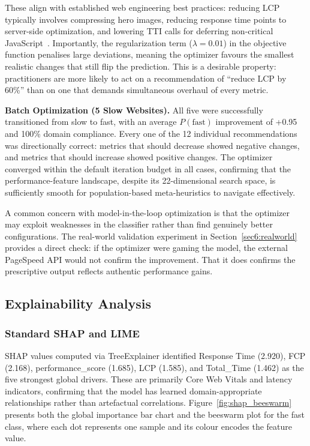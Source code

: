 \documentclass[sn-nature]{sn-jnl}
\begin{document}
These align with established web engineering best practices: reducing LCP typically involves compressing hero images, reducing response time points to server-side optimization, and lowering TTI calls for deferring non-critical JavaScript~\cite{vanriet2023, surianarayanan2023}. Importantly, the regularization term ($\lambda = 0.01$) in the objective function penalises large deviations, meaning the optimizer favours the smallest realistic changes that still flip the prediction. This is a desirable property: practitioners are more likely to act on a recommendation of ``reduce LCP by 60\%'' than on one that demands simultaneous overhaul of every metric.

\textbf{Batch Optimization (5 Slow Websites).} All five were successfully transitioned from slow to fast, with an average $P(\text{fast})$ improvement of +0.95 and 100\% domain compliance. Every one of the 12 individual recommendations was directionally correct: metrics that should decrease showed negative changes, and metrics that should increase showed positive changes. The optimizer converged within the default iteration budget in all cases, confirming that the performance-feature landscape, despite its 22-dimensional search space, is sufficiently smooth for population-based meta-heuristics to navigate effectively.

A common concern with model-in-the-loop optimization is that the optimizer may exploit weaknesses in the classifier rather than find genuinely better configurations. The real-world validation experiment in Section~\ref{sec6:realworld} provides a direct check: if the optimizer were gaming the model, the external PageSpeed API would not confirm the improvement. That it does confirms the prescriptive output reflects authentic performance gains.

\subsection{Explainability Analysis}

\subsubsection{Standard SHAP and LIME}\label{sec6:shap_lime}

SHAP values computed via TreeExplainer identified Response Time (2.920), FCP (2.168), performance\_score (1.685), LCP (1.585), and Total\_Time (1.462) as the five strongest global drivers. These are primarily Core Web Vitals and latency indicators, confirming that the model has learned domain-appropriate relationships rather than artefactual correlations. Figure~\ref{fig:shap_beeswarm} presents both the global importance bar chart and the beeswarm plot for the fast class, where each dot represents one sample and its colour encodes the feature value.
\end{document}

